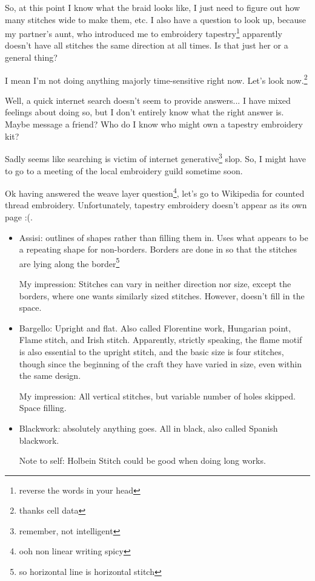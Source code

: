 \documentclass[12pt]{article}
\renewcommand{\,}{\textsuperscript{,}}
\begin{document}
\begin{itemize}
\begin{itemize}
\begin{itemize}
So, at this point I know what the braid looks like, I just need to figure out how many stitches wide to make them, etc.
I also have a question to look up, because my partner's aunt, who introduced me to embroidery tapestry\footnote{reverse the words in your head} apparently doesn't have all stitches the same direction at all times.
Is that just her or a general thing?

I mean I'm not doing anything majorly time-sensitive right now.
Let's look now.\footnote{thanks cell data}

Well, a quick internet search doesn't seem to provide answers...
I have mixed feelings about doing so, but I don't entirely know what the right answer is.
Maybe message a friend?
Who do I know who might own a tapestry embroidery kit?

Sadly seems like searching is victim of internet generative\footnote{remember, not intelligent} slop.
So, I might have to go to a meeting of the local embroidery guild sometime soon.

Ok having answered the weave layer question\footnote{ooh non linear writing spicy}, let's go to Wikipedia for counted thread embroidery.
Unfortunately, tapestry embroidery doesn't appear as its own page :(.
\begin{itemize}
\item Assisi: outlines of shapes rather than filling them in.
Uses what appears to be a repeating shape for non-borders.
Borders are done in so that the stitches are lying along the border\footnote{so horizontal line is horizontal stitch}

My impression: Stitches can vary in neither direction nor size, except the borders, where one wants similarly sized stitches.
However, doesn't fill in the space.

\item Bargello: Upright and flat.
Also called Florentine work, Hungarian point, Flame stitch, and Irish stitch.
Apparently, strictly speaking, the flame motif is also essential to the upright stitch, and the basic size is four stitches, though since the beginning of the craft they have varied in size, even within the same design.

My impression: All vertical stitches, but variable number of holes skipped. Space filling.

\item Blackwork: absolutely anything goes.
All in black, also called Spanish blackwork.

Note to self: Holbein Stitch could be good when doing long works.


\end{itemize}
\end{itemize}
\end{itemize}
\end{itemize}
\end{document}
